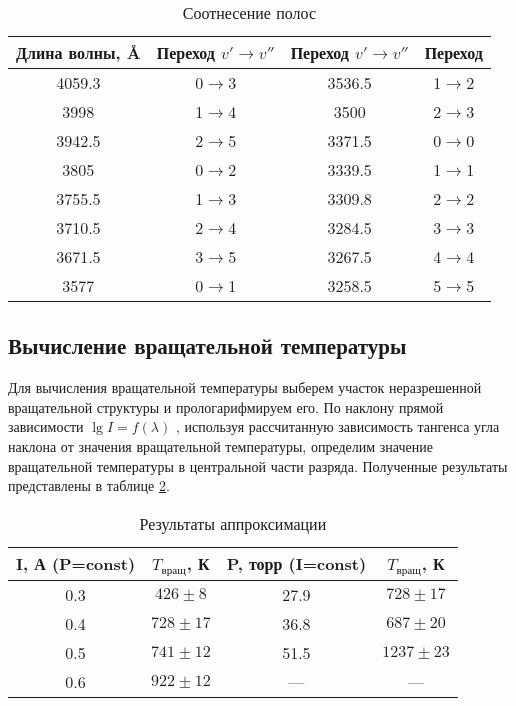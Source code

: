 \begin{table}[H]
	\centering
	\caption{Соотнесение полос}
	\begin{tabular}{|c|c|c|c|}
		\hline
		Длина волны, \AA & Переход $v'\to v''$ & Переход $v'\to v''$ & Переход \bigstrut\\
		\hline
		4059.3 & 0$\to$3 & 3536.5 & 1$\to$2 \bigstrut\\
		\hline
		3998 & 1$\to$4 & 3500 & 2$\to$3 \bigstrut\\
		\hline
		3942.5 & 2$\to$5 & 3371.5 & 0$\to$0 \bigstrut\\
		\hline
		3805 & 0$\to$2 & 3339.5 & 1$\to$1 \bigstrut\\
		\hline
		3755.5 & 1$\to$3 & 3309.8 & 2$\to$2 \bigstrut\\
		\hline
		3710.5 & 2$\to$4 & 3284.5 & 3$\to$3 \bigstrut\\
		\hline
		3671.5 & 3$\to$5 & 3267.5 & 4$\to$4 \bigstrut\\
		\hline
		3577 & 0$\to$1 & 3258.5 & 5$\to$5 \bigstrut\\
		\hline
	\end{tabular}%
	\label{tab:polosi}%
\end{table}%

\subsection{Вычисление вращательной температуры}
Для вычисления вращательной температуры выберем участок неразрешенной
вращательной структуры и прологарифмируем его. По наклону прямой зависимости $\lg I=f(\lambda)$ , используя рассчитанную
зависимость тангенса угла наклона от значения вращательной температуры, определим значение вращательной температуры в центральной части
разряда. Полученные результаты представлены в таблице \ref{tab:t_rot}.
\begin{table}[H]
	\centering
	\caption{Результаты аппроксимации}
	\begin{tabular}{|c|c|c|c|}
		\hline
		I, А (P=const)& $T_{\text{вращ}}$, К & P, торр (I=const) & $T_{\text{вращ}}$, К \bigstrut \bigstrut\\
		\hline
		0.3 & $426\pm8$ &27.9 & $728\pm17$\bigstrut\\
		\hline
		0.4 & $728\pm17$ &36.8 & $687\pm20$\bigstrut\\
		\hline
		0.5 & $741\pm12$ &51.5 & $1237\pm23$\bigstrut\\
		\hline
		0.6 & $922\pm12$ &--- & ---\bigstrut\\
		\hline
	\end{tabular}%
	\label{tab:t_rot}%
\end{table}%

